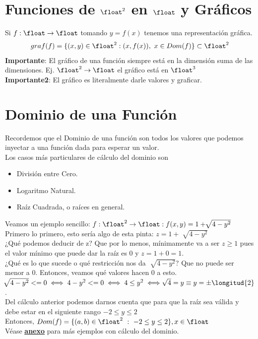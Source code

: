 \documentclass[10pt,a4paper]{article}
\begin{document}
\section*{Funciones de $\float^{2}$ en $\float$ y Gráficos}
Si $f:\float \rightarrow \float $ tomando $y=f(x)$ tenemos una representación gráfica. \\
\[graf(f) = \{(x,y) \in \float^{2} : (x, f(x)), \ x \in Dom(f)\} \subset \float^{2} \]
\textbf{Importante}: El gráfico de una función siempre está en la dimensión suma de las dimensiones. Ej. $\float^{2} \rightarrow \float$ el gráfico está en $\float^{3}$ \\
\textbf{Importante2}: El gráfico es literalmente darle valores y graficar.

\section*{Dominio de una Función}
Recordemos que el Dominio de una función son todos los valores que podemos inyectar a una función dada para esperar un valor. \\
Los casos más particulares de cálculo del dominio son 
\begin{itemize}
    \item División entre Cero.
    \item Logaritmo Natural. 
    \item Raíz Cuadrada, o raíces en general.
\end{itemize}
Veamos un ejemplo sencillo: $f:\float^{2} \rightarrow \float:f(x,y) = 1 + \sqrt[]{4-y^{2}}$ \\
Primero lo primero, esto sería algo de esta pinta: $z = 1 + \sqrt[]{4-y^{2}}$ \\
¿Qué podemos deducir de z? Que por lo menos, mínimamente va a ser $z \ge 1$ pues el valor mínimo que puede dar la raíz es 0 y $z = 1 + 0 = 1$. \\
¿Qué es lo que sucede o qué restricción nos da $\sqrt[]{4-y^{2}}$? Que no puede ser menor a 0. Entonces, veamos qué valores hacen 0 a esto. \\
$\sqrt[]{4-y^{2}} <= 0 \iff 4-y^{2} <= 0 \iff 4 \le y^{2} \iff \sqrt[]{4} = y \equiv y = \pm \longitud{2}$. \\
Del cálculo anterior podemos darnos cuenta que para que la raíz sea válida y debe estar en el siguiente rango $-2 \le y \le 2$ \\
Entonces, $Dom(f) = \{(a, b) \in \float^{2} \ : \ -2 \le y \le 2\}, x \in \float$ \\
Véase \hyperref[subsec:dominio_funciones]{\underline{\textbf{anexo}}} para más ejemplos con cálculo del dominio.
\end{document}
